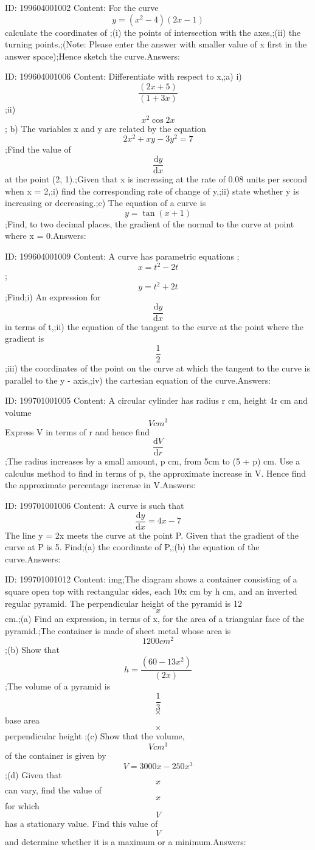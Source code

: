 \documentclass{article}
\begin{document}
ID: 199604001002
Content:
For the curve \[y=(x^2-4)(2x-1)\] calculate the coordinates of ;(i)	the points of intersection with the axes,;(ii)	the turning points.;(Note: Please enter the answer with smaller value of x first in the answer space);Hence sketch the curve.Answers:

ID: 199604001006
Content:
Differentiate with respect to x,;a) i) \[\frac{(2x+5)}{(1+3x)}\];ii) \[x^2\cos 2x\]; b) The variables x and y are related by the equation \[2x^2+xy-3y^2=7\];Find the value of \[\frac{\mathrm{d} y}{\mathrm{d} x}\] at the point (2, 1).;Given that x is increasing at the rate of 0.08 units per second when x = 2,;i) find the corresponding rate of change of y,;ii) state whether y is increasing or decreasing.;c) The equation of a curve is \[y=\tan (x+1)\];Find, to two decimal places, the gradient of the normal to the curve at point where x = 0.Answers:

ID: 199604001009
Content:
A curve has parametric equations ; \[x=t^2-2t\]; \[y=t^2+2t\];Find;i) An expression for \[\frac{\mathrm{d} y}{\mathrm{d} x}\] in terms of t,;ii) the equation of the tangent to the curve at the point where the gradient is \[\frac{1}{2}\];iii) the coordinates of the point on the curve at which the tangent to the curve is parallel to the y -  axis,;iv) the cartesian equation of the curve.Answers:

ID: 199701001005
Content:
A circular cylinder has radius r cm, height 4r cm and volume \[V cm^3\] Express V in terms of r and hence find \[\frac{\mathrm{d} V}{\mathrm{d} r}\];The radius increases by a small amount, p cm, from 5cm to (5 + p) cm. Use a calculus method to find in terms of p, the approximate increase in V. Hence find the approximate percentage increase in V.Answers:

ID: 199701001006
Content:
A curve is such that \[\frac{\mathrm{d}y}{\mathrm{d} x}=4x-7\] The line y = 2x meets the curve at the point P. Given that the gradient of the curve at P is 5. Find;(a)	the coordinate of P,;(b)	the equation of the curve.Answers:

ID: 199701001012
Content:
img;The diagram shows a container consisting of a square open top with rectangular sides, each 10x cm by h cm, and an inverted regular pyramid. The perpendicular height of the pyramid is 12\[x\] cm.;(a)	Find an expression, in terms of x, for the area of a triangular face of the pyramid.;The container is made of sheet metal whose area is \[1200cm^2\];(b)	Show that  \[h=\frac{(60-13x^2)}{(2x)}\];The volume of a pyramid is \[\frac{1}{3}\] \[\times\] base area \[\times\] perpendicular height ;(c)	Show that the volume, \[V cm^3\] of the container is given by \[V=3000x-250x^3\];(d)	Given that \[x\] can vary, find the value of \[x\] for which \[V\] has a stationary value. Find this value of \[V\] and determine whether it is a maximum or a minimum.Answers:
\end{document}
